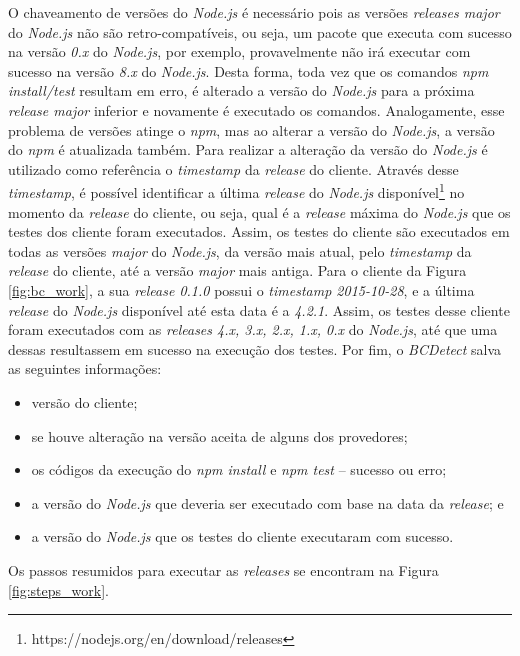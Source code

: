 O chaveamento de versões do \textit{Node.js} é necessário pois as versões \textit{releases major} do \textit{Node.js} não são retro-compatíveis, ou seja, um pacote que executa com sucesso na versão \textit{0.x} do \textit{Node.js}, por exemplo, provavelmente não irá executar com sucesso na versão \textit{8.x} do \textit{Node.js}. Desta forma, toda vez que os comandos \textit{npm install/test} resultam em erro, é alterado a versão do \textit{Node.js} para a próxima \textit{release major} inferior e novamente é executado os comandos. Analogamente, esse problema de versões atinge o \textit{npm}, mas ao alterar a versão do \textit{Node.js}, a versão do \textit{npm} é atualizada também. Para realizar a alteração da versão do \textit{Node.js} é utilizado como referência o \textit{timestamp} da \textit{release} do cliente. Através desse \textit{timestamp}, é possível identificar a última \textit{release} do \textit{Node.js} disponível\footnote{https://nodejs.org/en/download/releases} no momento da \textit{release} do cliente, ou seja, qual é a \textit{release} máxima do \textit{Node.js} que os testes dos cliente foram executados. Assim, os testes do cliente são executados em todas as versões \textit{major} do \textit{Node.js}, da versão mais atual, pelo \textit{timestamp} da \textit{release} do cliente, até a versão \textit{major} mais antiga. Para o cliente da Figura \ref{fig:bc_work}, a sua \textit{release 0.1.0} possui o \textit{timestamp 2015-10-28}, e a última \textit{release} do \textit{Node.js} disponível até esta data é a \textit{4.2.1}. Assim, os testes desse cliente foram executados com as \textit{releases 4.x, 3.x, 2.x, 1.x, 0.x} do \textit{Node.js}, até que uma dessas resultassem em sucesso na execução dos testes. Por fim, o \textit{BCDetect} salva as seguintes informações:

\begin{itemize}
    \item versão do cliente;
    \item se houve alteração na versão aceita de alguns dos provedores;
    \item os códigos da execução do \textit{npm install} e \textit{npm test} -- sucesso ou erro;
    \item a versão do \textit{Node.js} que deveria ser executado com base na data da \textit{release}; e
    \item a versão do \textit{Node.js} que os testes do cliente executaram com sucesso.
\end{itemize}{}

Os passos resumidos para executar as \textit{releases} se encontram na Figura \ref{fig:steps_work}.

